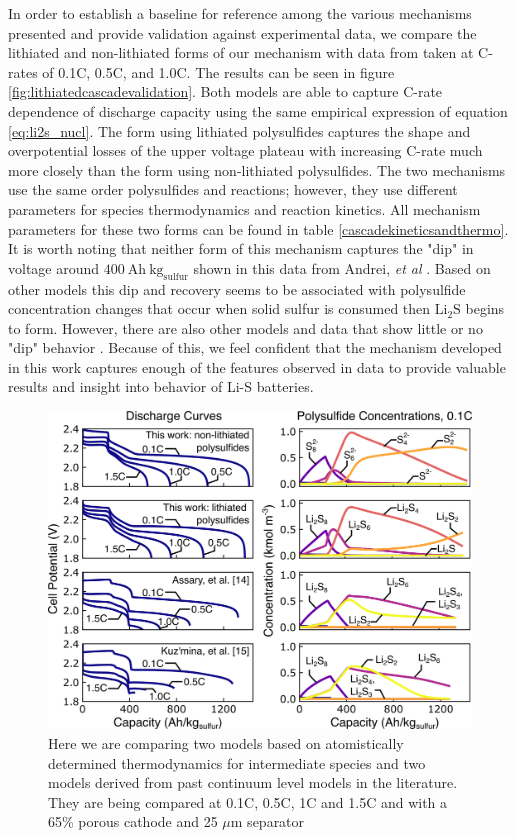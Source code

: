 \documentclass{elsarticle}
\begin{document}
In order to establish a baseline for reference among the various mechanisms presented  and provide validation against experimental data, we compare the lithiated and non-lithiated forms of our mechanism with data from \cite{ANDREI2018469} taken at C-rates of 0.1C, 0.5C, and 1.0C. The results can be seen in figure \ref{fig:lithiatedcascadevalidation}. Both models are able to capture C-rate dependence of discharge capacity using the same empirical expression of equation \ref{eq:li2s_nucl}. The form using lithiated polysulfides captures the shape and overpotential losses of the upper voltage plateau with increasing C-rate much more closely than the form using non-lithiated polysulfides. The two mechanisms use the same order polysulfides and reactions; however, they use different parameters for species thermodynamics and reaction kinetics. All mechanism parameters for these two forms can be found in table \ref{cascadekineticsandthermo}. It is worth noting that neither form of this mechanism captures the "dip" in voltage around $400 ~ \mathrm{Ah} ~ \mathrm{kg}_\mathrm{sulfur}$ shown in this data from Andrei, \textit{et al} \cite{ANDREI2018469}. Based on other models \cite{Neidhardt_2012} this dip and recovery seems to be associated with polysulfide concentration changes that occur when solid sulfur is consumed then $\mathrm{Li}_2\mathrm{S}$ begins to form. However, there are also other models and data that show little or no "dip" behavior \cite{REN2016115}. Because of this, we feel confident that the mechanism developed in this work captures enough of the features observed in data to provide valuable results and insight into behavior of Li-S batteries.

\begin{center}
\begin{figure}[b!]
    \centering
    \includegraphics[width=\textwidth]{Figures/Figure4_Mechanism_Comparison.png}
    \caption{Here we are comparing two models based on atomistically determined thermodynamics for intermediate species and two models derived from past continuum level models in the literature. They are being compared at 0.1C, 0.5C, 1C and 1.5C and with a 65\% porous cathode and 25 $\mu$m separator}
    \label{fig:mechanismcomparisonvoltage}
\end{figure}
\end{center}
\end{document}
